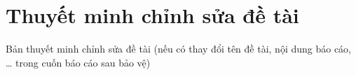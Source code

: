 \chapter*{Thuyết minh chỉnh sửa đề tài}
\label{revision}

Bản thuyết minh chỉnh sửa đề tài (nếu có thay đổi tên đề tài, nội dung báo cáo, \ldots{} trong cuốn báo cáo sau bảo vệ)
